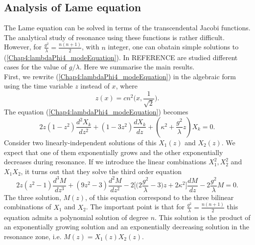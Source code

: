 \documentclass[11pt,a4paper,twoside]{book}
\begin{document}
\subsection{Analysis of Lame equation}
The Lame equation can be solved in terms of the transcendental Jacobi functions. The analytical study of resonance using these functions is rather difficult. However, for $\frac{g^{2}}{\lambda}=\frac{n(n+1)}{2}  $, with $ n  $ integer, one can obatain simple solutions to (\ref{Chap4:lambdaPhi4_modeEquation}). In REFERENCE are studied different cases for the value of $ g/\lambda $. Here we summarise the main results.\\
First, we rewrite (\ref{Chap4:lambdaPhi4_modeEquation}) in the algebraic form using the time variable $ z $ instead of $ x $, where
\begin{equation}
	\label{Chap4:lambdaPhi4}
	z(x)=cn^{2}\Bigg(x,\frac{1}{\sqrt{2}}\Bigg).
\end{equation}
The equation (\ref{Chap4:lambdaPhi4_modeEquation}) becomes
\begin{equation}
\label{Chap4:lambdaPhi4_fluctuations}
2z(1-z^{2})\frac{d^{2}X_{k}}{dz^{2}} + (1-3z^{2})\frac{dX_{k}}{dz} + (\kappa^{2} + \frac{g^{2}}{\lambda}z)X_{k}=0.
\end{equation}
Consider two linearly-independent solutions of this $ X_{1}(z) $ and $ X_{2}(z) $. We expect that one of them exponentially grows and the other exponentially decreases during resonance. If we introduce the linear combinations $ X_{1}^{2}, X_{2}^{2} $ and $ X_{1}X_{2} $, it turns out that they solve the third order equation 
\begin{equation}
\label{Chap4:lambdaPhi4_equationForMz}
2z(z^{2}-1)\frac{d^{3}M}{dz^{3}} + (9z^{2}-3)\frac{d^{2}M}{dz^{2}} -2\Bigg[\bigg(2\frac{g^{2}}{\lambda} - 3\bigg)z + 2\kappa^{2}\Bigg]\frac{dM}{dz} - 2\frac{g^{2}}{\lambda}M = 0.
\end{equation}
The three solution, $ M(z) $, of this equation correspond to the three bilinear combinations of $ X_{1} $ and $ X_{2} $. The important point is that for $ \frac{g^{2}}{\lambda} = \frac{n(n+1)}{2} $ this equation admits a polynomial solution of degree $ n $. This solution is the product of an exponentially growing solution and an exponentially decreasing solution in the resonance zone, i.e. $ M(z)=X_{1}(z)X_{2}(z) $.
\end{document}
